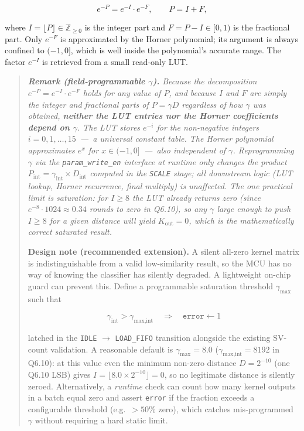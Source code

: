 \documentclass[11pt,a4paper]{article}
\begin{document}
\begin{equation}
  e^{-P} = e^{-I} \cdot e^{-F}, \qquad P = I + F,
  \label{eq:decomp}
\end{equation}

where $I = \lfloor P \rfloor \in \mathbb{Z}_{\geq 0}$ is the integer part and
$F = P - I \in [0,1)$ is the fractional part.  Only $e^{-F}$ is approximated
by the Horner polynomial; its argument is always confined to $(-1, 0]$, which
is well inside the polynomial's accurate range.  The factor $e^{-I}$ is
retrieved from a small read-only LUT.

\begin{quote}\itshape
\textbf{Remark (field-programmable $\gamma$).}
Because the decomposition $e^{-P} = e^{-I} \cdot e^{-F}$ holds for any
value of $P$, and because $I$ and $F$ are simply the integer and fractional
parts of $P = \gamma D$ regardless of how $\gamma$ was obtained, \textbf{neither
the LUT entries nor the Horner coefficients depend on $\gamma$}.
The LUT stores $e^{-i}$ for the non-negative integers $i = 0,1,\ldots,15$~---~a
universal constant table.
The Horner polynomial approximates $e^x$ for $x \in (-1,0]$~---~also
independent of $\gamma$.
Reprogramming $\gamma$ via the \texttt{param\_write\_en} interface at runtime
only changes the product $P_\text{int} = \gamma_\text{int} \times D_\text{int}$
computed in the \texttt{SCALE} stage; all downstream logic (LUT lookup, Horner
recurrence, final multiply) is unaffected.
The one practical limit is saturation: for $I \geq 8$ the LUT already
returns zero (since $e^{-8} \cdot 1024 \approx 0.34$ rounds to zero in Q6.10),
so any $\gamma$ large enough to push $I \geq 8$ for a given distance will
yield $K_\text{out} = 0$, which is the mathematically correct saturated result.

\medskip
\textbf{Design note (recommended extension).}
A silent all-zero kernel matrix is indistinguishable from a valid low-similarity
result, so the MCU has no way of knowing the classifier has silently degraded.
A lightweight on-chip guard can prevent this.  Define a programmable
saturation threshold $\gamma_\text{max}$ such that

\begin{equation}
  \gamma_\text{int} > \gamma_\text{max,int}
  \quad\Longrightarrow\quad
  \texttt{error} \leftarrow 1
  \label{eq:gamma_guard}
\end{equation}

latched in the \texttt{IDLE} $\to$ \texttt{LOAD\_FIFO} transition alongside
the existing SV-count validation.
A reasonable default is $\gamma_\text{max} = 8.0$
($\gamma_\text{max,int} = 8192$ in Q6.10): at this value even the minimum
non-zero distance $D = 2^{-10}$ (one Q6.10 LSB) gives
$I = \lfloor 8.0 \times 2^{-10} \rfloor = 0$, so no legitimate distance is
silently zeroed.
Alternatively, a \emph{runtime} check can count how many kernel outputs in a
batch equal zero and assert \texttt{error} if the fraction exceeds a
configurable threshold (e.g.\ $> 50\%$ zero), which catches mis-programmed
$\gamma$ without requiring a hard static limit.
\end{quote}
\end{document}
